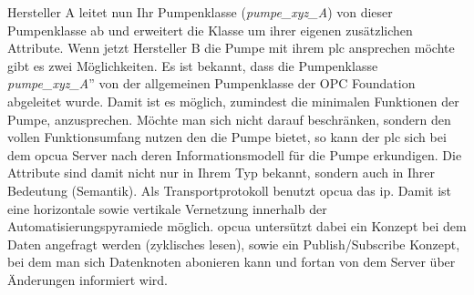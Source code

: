 Hersteller A leitet nun Ihr Pumpenklasse (\emph{pumpe\_xyz\_A}) von dieser Pumpenklasse ab und erweitert die Klasse um ihrer eigenen zusätzlichen Attribute.
Wenn jetzt Hersteller B die Pumpe mit ihrem \ac{plc} ansprechen möchte gibt es zwei Möglichkeiten.
Es ist bekannt, dass die Pumpenklasse \glqq{}\emph{pumpe\_xyz\_A}'' von der allgemeinen Pumpenklasse der OPC Foundation abgeleitet wurde.
Damit ist es möglich, zumindest die minimalen Funktionen der Pumpe, anzusprechen. 
Möchte man sich nicht darauf beschränken, sondern den vollen Funktionsumfang nutzen den die Pumpe bietet, 
so kann der \ac{plc} sich bei dem \ac{opcua} Server nach deren Informationsmodell für die Pumpe erkundigen.
Die Attribute sind damit nicht nur in Ihrem Typ bekannt, sondern auch in Ihrer Bedeutung (Semantik).
Als Transportprotokoll benutzt \ac{opcua} das \ac{ip}. 
Damit ist eine horizontale sowie vertikale Vernetzung innerhalb der Automatisierungspyramiede möglich.
\ac{opcua} untersützt dabei ein Konzept bei dem Daten angefragt werden (zyklisches lesen), sowie ein Publish/Subscribe Konzept, 
bei dem man sich Datenknoten abonieren kann und fortan von dem Server über Änderungen informiert wird.


